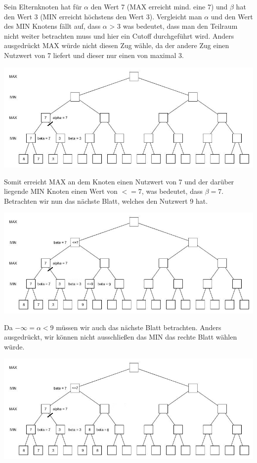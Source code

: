 Sein Elternknoten hat für $\alpha$ den Wert 7 (MAX erreicht mind. eine 7) und $\beta$ hat den Wert 3 (MIN erreicht höchstens den Wert 3). Vergleicht man $\alpha$ und den Wert des MIN Knotens fällt auf, dass $\alpha$ > 3 was bedeutet, dass man den Teilraum nicht weiter betrachten muss und hier ein Cutoff durchgeführt wird. Anders ausgedrückt MAX würde nicht diesen Zug wähle, da der andere Zug einen Nutzwert von 7 liefert und dieser nur einen von maximal 3.

\begin{center}
	\includegraphics[width = 12 cm]{chapters/minimax/jpg/Alpha-beta3-1.jpg}
\end{center}

Somit erreicht MAX an dem Knoten einen Nutzwert von 7 und der darüber liegende MIN Knoten einen Wert von $<=7$, was bedeutet, dass $\beta = 7$. Betrachten wir nun das nächste Blatt, welches den Nutzwert 9 hat.

\begin{center}
	\includegraphics[width = 12 cm]{chapters/minimax/jpg/Alpha-beta4.jpg}
\end{center}

 Da $-\infty = \alpha <9$ müssen wir auch das nächste Blatt betrachten. Anders ausgedrückt, wir können nicht ausschließen das MIN das rechte Blatt wählen würde.

 \begin{center}
 	\includegraphics[width = 12 cm]{chapters/minimax/jpg/Alpha-beta5.jpg}
 \end{center}

